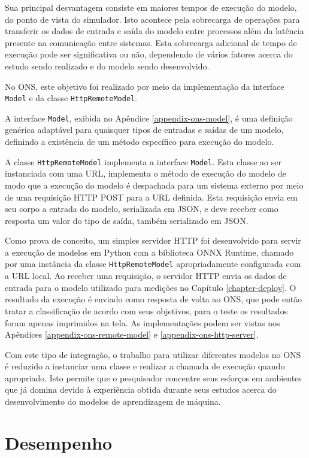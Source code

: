 Sua principal desvantagem consiste em maiores tempos de execução do modelo, do ponto de vista do simulador. Isto acontece pela sobrecarga de operações para transferir os dados de entrada e saída do modelo entre processos além da latência presente na comunicação entre sistemas. Esta sobrecarga adicional de tempo de execução pode ser significativa ou não, dependendo de vários fatores acerca do estudo sendo realizado e do modelo sendo desenvolvido.

No ONS, este objetivo foi realizado por meio da implementação da interface \texttt{Model} e da classe \texttt{HttpRemoteModel}.

A interface \texttt{Model}, exibida no Apêndice \ref{appendix-ons-model}, é uma definição genérica adaptável para quaisquer tipos de entradas e saídas de um modelo, definindo a existência de um método específico para execução do modelo.

A classe \texttt{HttpRemoteModel} implementa a interface \texttt{Model}. Esta classe ao ser instanciada com uma URL, implementa o método de execução do modelo de modo que a execução do modelo é despachada para um sistema externo por meio de uma requisição HTTP POST para a URL definida. Esta requisição envia em seu corpo a entrada do modelo, serializada em JSON, e deve receber como resposta um valor do tipo de saída, também serializado em JSON.

Como prova de conceito, um simples servidor HTTP foi desenvolvido para servir a execução de modelos em Python com a biblioteca ONNX Runtime, chamado por uma instância da classe \texttt{HttpRemoteModel} apropriadamente configurada com a URL local. Ao receber uma requisição, o servidor HTTP envia os dados de entrada para o modelo utilizado para medições no Capítulo \ref{chapter-deploy}. O resultado da execução é enviado como resposta de volta ao ONS, que pode então tratar a classificação de acordo com seus objetivos, para o teste os resultados foram apenas imprimidos na tela. As implementações podem ser vistas nos Apêndices \ref{appendix-ons-remote-model} e \ref{appendix-ons-http-server}.

Com este tipo de integração, o trabalho para utilizar diferentes modelos no ONS é reduzido a instanciar uma classe e realizar a chamada de execução quando apropriado. Isto permite que o pesquisador concentre seus esforços em ambientes que já domina devido à experiência obtida durante seus estudos acerca do desenvolvimento do modelos de aprendizagem de máquina.

\section{Desempenho}

